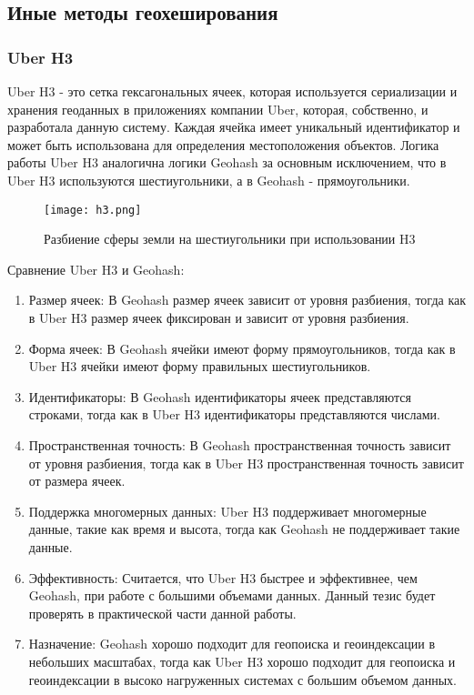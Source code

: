 \subsection{Иные методы геохеширования}
\subsubsection{Uber H3}
Uber H3 - это сетка гексагональных ячеек, которая используется сериализации и хранения геоданных в приложениях компании Uber, которая, собственно, и разработала данную систему. Каждая ячейка имеет уникальный идентификатор и может быть использована для определения местоположения объектов. Логика работы Uber H3 аналогична логики Geohash за основным исключением, что в Uber H3 используются шестиугольники, а в Geohash - прямоугольники.

\begin{figure}[h]
    \centering
    \texttt{[image: h3.png]}
    \caption{Разбиение сферы земли на шестиугольники при использовании H3}
\end{figure}

Сравнение Uber H3 и Geohash:
\begin{enumerate}
    \item Размер ячеек: В Geohash размер ячеек зависит от уровня разбиения, тогда как в Uber H3 размер ячеек фиксирован и зависит от уровня разбиения.
    \item Форма ячеек: В Geohash ячейки имеют форму прямоугольников, тогда как в Uber H3 ячейки имеют форму правильных шестиугольников.
    \item Идентификаторы: В Geohash идентификаторы ячеек представляются строками, тогда как в Uber H3 идентификаторы представляются числами.
    \item Пространственная точность: В Geohash пространственная точность зависит от уровня разбиения, тогда как в Uber H3 пространственная точность зависит от размера ячеек.
    \item Поддержка многомерных данных: Uber H3 поддерживает многомерные данные, такие как время и высота, тогда как Geohash не поддерживает такие данные.
    \item Эффективность: Считается, что Uber H3 быстрее и эффективнее, чем Geohash, при работе с большими объемами данных. Данный тезис будет проверять в практической части данной работы.
    \item Назначение: Geohash хорошо подходит для геопоиска и геоиндексации в небольших масштабах, тогда как Uber H3 хорошо подходит для геопоиска и геоиндексации в высоко нагруженных системах с большим объемом данных.
\end{enumerate}

